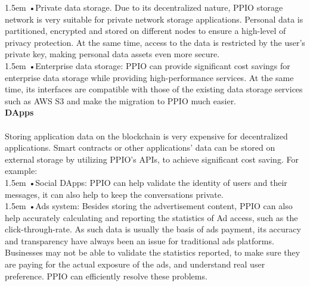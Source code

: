 \documentclass[10pt,a4paper]{article}
\begin{document}
\hangindent 1.5em
\noindent   
•\quad Private data storage. Due to its decentralized nature, PPIO storage network is very suitable for private network storage applications. Personal data is partitioned, encrypted and stored on different nodes to ensure a high-level of privacy protection. At the same time, access to the data is restricted by the user’s private key, making personal data assets even more secure.
  \vspace{-0.8em}
\\

\hangindent 1.5em
\noindent   
•\quad Enterprise data storage: PPIO can provide significant cost savings for enterprise data storage while providing high-performance services. At the same time, its interfaces are compatible with those of the existing data storage services such as AWS S3 and make the migration to PPIO much easier.
  \vspace{-0.5em}
 \\

\noindent   
 {\bf DApps}
   \vspace{-0.6em}
\\ \\Storing application data on the blockchain is very expensive for decentralized applications. Smart contracts or other applications' data can be stored on external storage by utilizing PPIO’s APIs, to achieve significant cost saving. For example:
  \vspace{-0.8em}
\\

\hangindent 1.5em
\noindent   
•\quad Social DApps: PPIO can help validate the identity of users and their messages, it can also help to keep the conversations private.
  \vspace{-0.8em}
\\

\hangindent 1.5em
\noindent   
•\quad Ads system: Besides storing the advertisement content,  PPIO can also help accurately calculating and reporting the statistics of Ad access, such as the click-through-rate. As such data is usually the basis of ads payment, its accuracy and transparency have always been an issue for traditional ads platforms. Businesses may not be able to validate the statistics reported, to make sure they are paying for the actual exposure of the ads, and understand real user preference. PPIO can efficiently resolve these problems.
  \vspace{-0.8em}
\\
\end{document}

